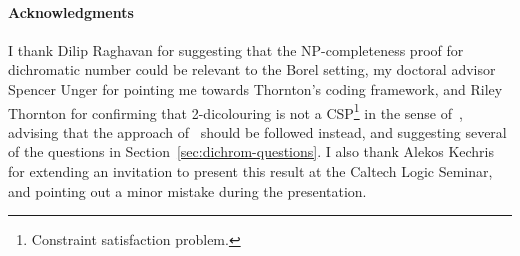 \paragraph{Acknowledgments}
I thank Dilip Raghavan for suggesting that the NP-completeness proof for dichromatic number could be relevant to the Borel setting, my doctoral advisor Spencer Unger for pointing me towards Thornton's coding framework, and Riley Thornton for confirming that 2-dicolouring is not a CSP\footnote{Constraint satisfaction problem.} in the sense of~\cite{thornton-thesis}, advising that the approach of~\cite[Appendix~A]{thornton2022algebraic} should be followed instead, and suggesting several of the questions in Section~\ref{sec:dichrom-questions}.
I also thank Alekos Kechris for extending an invitation to present this result at the Caltech Logic Seminar, and pointing out a minor mistake during the presentation.